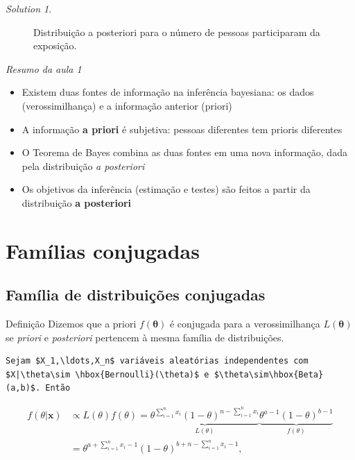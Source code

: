 \documentclass[
  letterpaper,
  DIV=11,
  numbers=noendperiod]{scrreprt}
\theoremstyle{definition}
\theoremstyle{definition}
\theoremstyle{remark}
\newtheorem*{solution}{Solution}
\begin{document}
\begin{solution}
\begin{figure}[H]
{}

\caption{\label{fig-poissonExposicao1}Distribuição a posteriori para o
número de pessoas participaram da exposição.}

\end{figure}

\end{solution}

\emph{Resumo da aula 1}

\begin{itemize}
\item
  Existem duas fontes de informação na inferência bayesiana: os dados
  (verossimilhança) e a informação anterior (priori)
\item
  A informação \textbf{a priori} é subjetiva: pessoas diferentes tem
  prioris diferentes
\item
  O Teorema de Bayes combina as duas fontes em uma nova informação, dada
  pela distribuição \textit{a posteriori}
\item
  Os objetivos da inferência (estimação e testes) são feitos a partir da
  distribuição \textbf{a posteriori}
\end{itemize}


\hypertarget{famuxedlias-conjugadas}{%
\chapter{Famílias conjugadas}\label{famuxedlias-conjugadas}}

\hypertarget{famuxedlia-de-distribuiuxe7uxf5es-conjugadas}{%
\section{Família de distribuições
conjugadas}\label{famuxedlia-de-distribuiuxe7uxf5es-conjugadas}}

Definição Dizemos que a priori \(f(\boldsymbol{\theta})\) é conjugada
para a verossimilhança \(L(\boldsymbol{\theta})\) se \emph{priori} e
\emph{posteriori} pertencem à mesma família de distribuições.

\begin{verbatim}
Sejam $X_1,\ldots,X_n$ variáveis aleatórias independentes com $X|\theta\sim \hbox{Bernoulli}(\theta)$ e $\theta\sim\hbox{Beta}(a,b)$. Então
\end{verbatim}

\[\begin{align}
    f(\theta|\boldsymbol{x})&\varpropto L(\theta)f(\theta) = \underbrace{\theta^{\sum_{i=1}^{n}x_i} (1-\theta)^{n-\sum_{i=1}^{n}x_i}}_{L(\theta)}\underbrace{\theta^{a-1}(1-\theta)^{b-1}}_{f(\theta)}\\
    &=\theta^{a+\sum_{i=1}^n x_i-1}(1-\theta)^{b+n-\sum_{i=1}^{n}x_i-1},
    \end{align}\]
\end{document}
